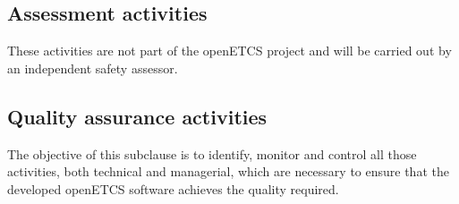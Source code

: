 \documentclass{template/openetcs_report}
\begin{document}
\subsection{Assessment activities}
These activities are not part of the openETCS project and will be carried out by an independent safety assessor.


\subsection{Quality assurance activities}
\begin{flushleft}
The objective of this subclause is to identify, monitor and control all those activities, both technical and managerial, which are necessary to ensure that the developed openETCS software achieves the quality required. 
\end{flushleft}
\end{document}
